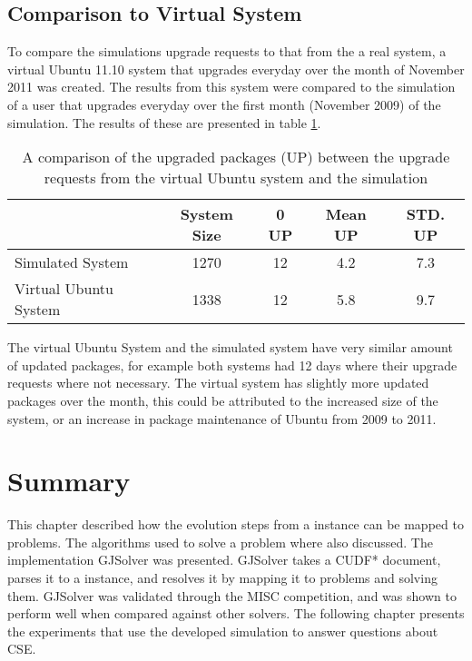 \subsection{Comparison to Virtual System}
To compare the simulations upgrade requests to that from the a real system, a virtual Ubuntu 11.10 system that upgrades everyday over the month of November 2011 was created.
The results from this system were compared to the simulation of a user that upgrades everyday over the first month (November 2009) of the simulation.
The results of these are presented in table \ref{implementation.validvirtual}.
\begin{table}[htp]
\begin{center}
\begin{tabular}{| l | c |  c | c | c |}
\hline
&	System Size & 0 UP & Mean UP & STD. UP \\ \hline
Simulated System			& 1270 	& 12	 	& 4.2 		 	& 7.3 	\\
Virtual Ubuntu System 		& 1338 	& 12 		& 5.8 	 		& 9.7 	\\ \hline
\end{tabular}
\end{center}
\caption[Comparison of upgraded packages between the virtual Ubuntu 11.10 system and the simulation.]{A comparison of the upgraded packages (UP) between the upgrade requests from the virtual Ubuntu system and the simulation}
\label{implementation.validvirtual}
\end{table}

The virtual Ubuntu System and the simulated system have very similar amount of updated packages,
for example both systems had 12 days where their upgrade requests where not necessary.
The virtual system has slightly more updated packages over the month,
this could be attributed to the increased size of the system, or an increase in package maintenance of Ubuntu from 2009 to 2011. 

\section{Summary}
This chapter described how the evolution steps from a \modelname instance can be mapped to \modelimpl problems.
The algorithms used to solve a \modelimpl problem where also discussed.
The implementation GJSolver was presented.
GJSolver takes a CUDF* document, parses it to a \modelname instance, and resolves it by mapping it to \modelimpl problems and solving them.
GJSolver was validated through the MISC competition, and was shown to perform well when compared against other solvers.
The following chapter presents the experiments that use the developed simulation to answer questions about CSE.
